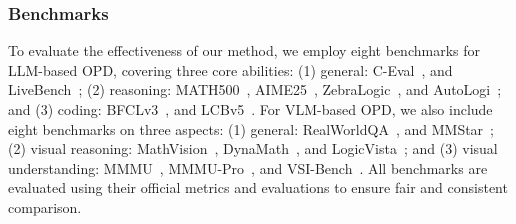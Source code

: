 \documentclass{llmxive}
\begin{document}
\subsubsection{Benchmarks}
To evaluate the effectiveness of our method, we employ eight benchmarks for LLM-based OPD, covering three core abilities: (1) general: C-Eval~\citep{huang2023c}, and LiveBench~\citep{white2024livebench}; (2) reasoning: MATH500~\citep{hendrycks2021measuring}, AIME25~\citep{aime25aimi}, ZebraLogic~\citep{lin2025zebralogic}, and AutoLogi~\citep{zhu2025autologi}; and (3) coding: BFCLv3~\citep{bfcl24bfcl}, and LCBv5~\citep{jain2025livecodebench}. For VLM-based OPD, we also include eight benchmarks on three aspects: (1) general: RealWorldQA~\citep{realworld24real}, and MMStar~\citep{chen2024we}; (2) visual reasoning: MathVision~\citep{wang2024measuring}, DynaMath~\citep{zou2025dynamath}, and LogicVista~\citep{xiao2024logicvista}; and (3) visual understanding: MMMU~\citep{yue2024mmmu}, MMMU-Pro~\citep{yue2025mmmu}, and VSI-Bench~\citep{yang2025thinking}. All benchmarks are evaluated using their official metrics and evaluations to ensure fair and consistent comparison.
\end{document}
